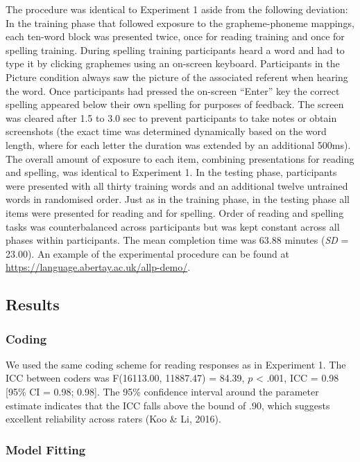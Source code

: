 \documentclass[doc,floatsintext]{apa6}
\begin{document}
The procedure was identical to Experiment 1 aside from the following
deviation: In the training phase that followed exposure to the
grapheme-phoneme mappings, each ten-word block was presented twice, once
for reading training and once for spelling training. During spelling
training participants heard a word and had to type it by clicking
graphemes using an on-screen keyboard. Participants in the Picture
condition always saw the picture of the associated referent when hearing
the word. Once participants had pressed the on-screen \enquote{Enter}
key the correct spelling appeared below their own spelling for purposes
of feedback. The screen was cleared after 1.5 to 3.0 sec to prevent
participants to take notes or obtain screenshots (the exact time was
determined dynamically based on the word length, where for each letter
the duration was extended by an additional 500ms). The overall amount of
exposure to each item, combining presentations for reading and spelling,
was identical to Experiment 1. In the testing phase, participants were
presented with all thirty training words and an additional twelve
untrained words in randomised order. Just as in the training phase, in
the testing phase all items were presented for reading and for spelling.
Order of reading and spelling tasks was counterbalanced across
participants but was kept constant across all phases within
participants. The mean completion time was 63.88 minutes (\emph{SD} =
23.00). An example of the experimental procedure can be found at
\url{https://language.abertay.ac.uk/allp-demo/}.

\subsection{Results}\label{results-1}

\subsubsection{Coding}\label{coding-1}

We used the same coding scheme for reading responses as in Experiment 1.
The ICC between coders was F(16113.00, 11887.47) = 84.39, \(p\)
\textless{} .001, ICC = 0.98 {[}95\% CI = 0.98; 0.98{]}. The 95\%
confidence interval around the parameter estimate indicates that the ICC
falls above the bound of .90, which suggests excellent reliability
across raters (Koo \& Li, 2016).

\subsubsection{Model Fitting}\label{model-fitting-1}
\end{document}
